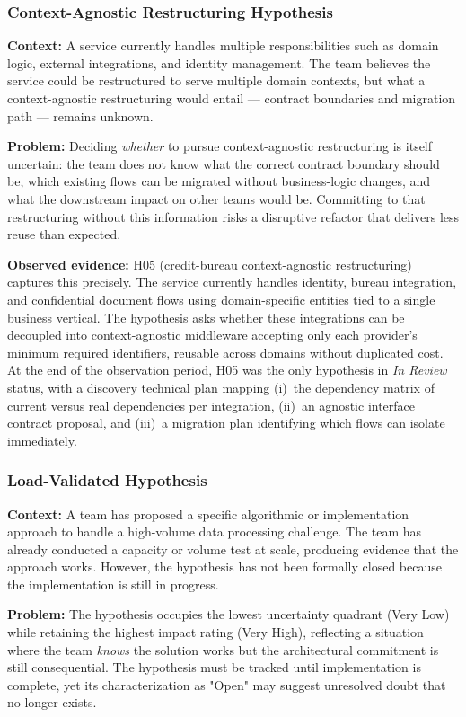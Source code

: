 \subsubsection{Context-Agnostic Restructuring Hypothesis}
\label{subsubsec:pattern-b3}
\textbf{Context:} A service currently handles multiple responsibilities such as domain
logic, external integrations, and identity management. The team believes the service could be restructured to serve
multiple domain contexts, but what a context-agnostic restructuring would entail --- contract boundaries and migration path --- remains unknown.

\textbf{Problem:} Deciding \textit{whether} to pursue context-agnostic restructuring is itself uncertain: the
team does not know what the correct contract boundary should be, which existing
flows can be migrated without business-logic changes, and what the downstream
impact on other teams would be. Committing to that restructuring without this information
risks a disruptive refactor that delivers less reuse than expected.

\textbf{Observed evidence:} H05 (credit-bureau context-agnostic restructuring) captures this
precisely. The service currently handles identity, bureau integration, and
confidential document flows using domain-specific entities tied to a single
business vertical. The hypothesis asks whether these integrations can be
decoupled into context-agnostic middleware accepting only each provider's minimum
required identifiers, reusable across domains without duplicated cost. At the
end of the observation period, H05 was the only hypothesis in \textit{In Review}
status, with a discovery technical plan mapping (i)~the dependency matrix of
current versus real dependencies per integration, (ii)~an agnostic interface
contract proposal, and (iii)~a migration plan identifying which flows can isolate
immediately.

\subsubsection{Load-Validated Hypothesis}
\label{subsubsec:pattern-b4}
\textbf{Context:} A team has proposed a specific algorithmic or implementation
approach to handle a high-volume data processing challenge. The team has already
conducted a capacity or volume test at scale, producing evidence that the
approach works. However, the hypothesis has not been formally closed because
the implementation is still in progress.

\textbf{Problem:} The hypothesis occupies the lowest uncertainty quadrant
(Very Low) while retaining the highest impact rating (Very High), reflecting a
situation where the team \textit{knows} the solution works but the architectural
commitment is still consequential. The hypothesis must be tracked until
implementation is complete, yet its characterization as "Open" may suggest
unresolved doubt that no longer exists.

